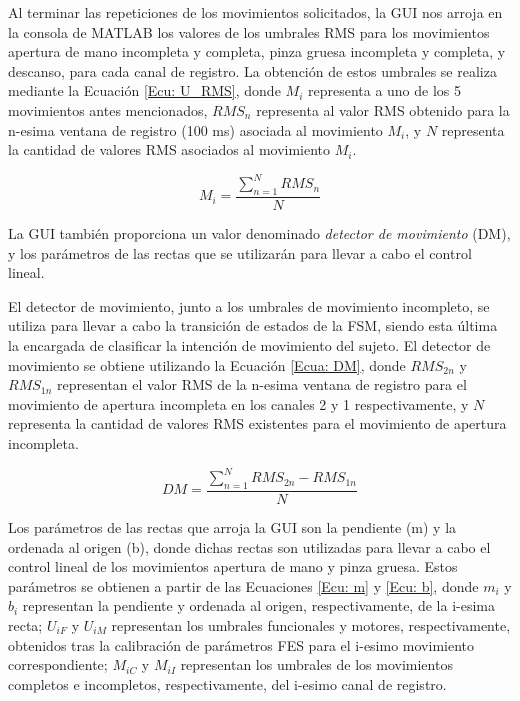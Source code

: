 Al terminar las repeticiones de los movimientos solicitados, la GUI nos arroja en la consola de MATLAB los valores de los umbrales RMS para los movimientos apertura de mano incompleta y completa, pinza gruesa incompleta y completa, y descanso, para cada canal de registro. La obtención de estos umbrales se realiza mediante la Ecuación \ref{Ecu: U_RMS}, donde $M_i$ representa a uno de los 5 movimientos antes mencionados, $RMS_n$ representa al valor RMS obtenido para la n-esima ventana de registro (100 ms) asociada al movimiento $M_i$, y $N$ representa la cantidad de valores RMS asociados al movimiento $M_i$.

\begin{equation}
	M_i = \frac{\sum_{n=1}^{N}RMS_{n}}{N}
	\label{Ecu: U_RMS}
\end{equation}

La GUI también proporciona un valor denominado \emph{detector de movimiento} (DM), y los parámetros de las rectas que se utilizarán para llevar a cabo el control lineal.

El detector de movimiento, junto a los umbrales de movimiento incompleto, se utiliza para llevar a cabo la transición de estados de la FSM, siendo esta última la encargada de clasificar la intención de movimiento del sujeto. El detector de movimiento se obtiene utilizando la Ecuación \ref{Ecua: DM}, donde $RMS_{2n}$ y $RMS_{1n}$ representan el valor RMS de la n-esima ventana de registro para el movimiento de apertura incompleta en los canales 2 y 1 respectivamente, y $N$ representa la cantidad de valores RMS existentes para el movimiento de apertura incompleta.

\begin{equation}
	DM = \frac{\sum_{n=1}^{N}RMS_{2n}-RMS_{1n}}{N}
	\label{Ecua: DM}
\end{equation}

Los parámetros de las rectas que arroja la GUI son la pendiente (m) y la ordenada al origen (b), donde dichas rectas son utilizadas para llevar a cabo el control lineal de los movimientos apertura de mano y pinza gruesa. Estos parámetros se obtienen a partir de las Ecuaciones \ref{Ecu: m} y \ref{Ecu: b}, donde $m_{i}$ y $b_{i}$ representan la pendiente y ordenada al origen, respectivamente, de la i-esima recta; $U_{iF}$ y $U_{iM}$ representan los umbrales funcionales y motores, respectivamente, obtenidos tras la calibración de parámetros FES para el i-esimo movimiento correspondiente; $M_{iC}$ y $M_{iI}$ representan los umbrales de los movimientos completos e incompletos, respectivamente, del i-esimo canal de registro.

